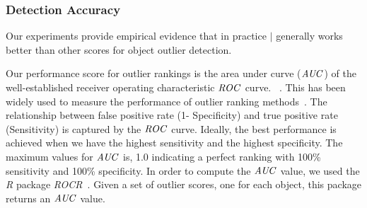 \begin{table}[htbp]
\begin{subtable}
											\end{subtable}
											
										\end{table}
												\subsubsection{Detection Accuracy} \label{sec:detection}
												 Our experiments provide empirical evidence that in practice $\mid$ generally works better than other scores for object outlier detection.
										
												 Our performance score for outlier rankings is the area under curve ($\it{AUC}$) of the well-established receiver operating characteristic $\it{ROC}$ curve.
												 ~\cite{Fawcett2006}. 
												 This has been widely used to measure the performance of outlier ranking methods~\cite{Cansado2008, Muller2012}. The relationship between false positive rate (1- Specificity) and true positive rate (Sensitivity) is captured by the $\it{ROC}$ curve. Ideally, the best performance is achieved when we have the highest sensitivity and the highest specificity. 
												 The maximum values for $\it{AUC}$ is, 1.0 indicating a perfect ranking with 100\% sensitivity and 100\% specificity. In order to compute the $\it{AUC}$ value, we used the \textit{R} package \textit{ROCR}~\cite{RROCR2012}. Given a set of outlier scores, one for each object, this package returns an $\it{AUC}$ value. 
